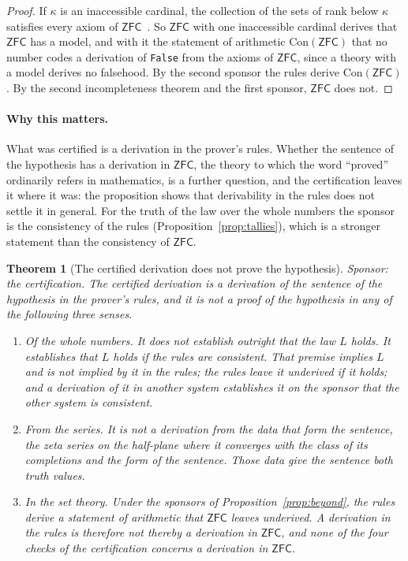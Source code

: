 \documentclass[11pt]{article}
\newtheorem{theorem}{Theorem}[section]
\theoremstyle{definition}
\theoremstyle{remark}
\DeclareRobustCommand{\lean}[1]{{\renewcommand{\_}{\textunderscore\allowbreak}\texttt{#1}}}
\newcommand{\False}{\lean{False}}
\begin{document}
\begin{proof}
If $\kappa$ is an inaccessible cardinal, the collection of the sets of rank below $\kappa$ satisfies every axiom of $\mathsf{ZFC}$~\citep[ch.~12]{jech}. So $\mathsf{ZFC}$ with one inaccessible cardinal derives that $\mathsf{ZFC}$ has a model, and with it the statement of arithmetic $\mathrm{Con}(\mathsf{ZFC})$ that no number codes a derivation of \False{} from the axioms of $\mathsf{ZFC}$, since a theory with a model derives no falsehood. By the second sponsor the rules derive $\mathrm{Con}(\mathsf{ZFC})$. By the second incompleteness theorem and the first sponsor, $\mathsf{ZFC}$ does not.
\end{proof}

\paragraph{Why this matters.} What was certified is a derivation in the prover's rules. Whether the sentence of the hypothesis has a derivation in $\mathsf{ZFC}$, the theory to which the word ``proved'' ordinarily refers in mathematics, is a further question, and the certification leaves it where it was: the proposition shows that derivability in the rules does not settle it in general. For the truth of the law over the whole numbers the sponsor is the consistency of the rules (Proposition~\ref{prop:tallies}), which is a stronger statement than the consistency of $\mathsf{ZFC}$.

\begin{theorem}[The certified derivation does not prove the hypothesis]\label{thm:notproof}
Sponsor: the certification. The certified derivation is a derivation of the sentence of the hypothesis in the prover's rules, and it is not a proof of the hypothesis in any of the following three senses.
\begin{enumerate}[leftmargin=2em,itemsep=1pt]
\item \emph{Of the whole numbers.} It does not establish outright that the law $L$ holds. It establishes that $L$ holds if the rules are consistent. That premise implies $L$ and is not implied by it in the rules; the rules leave it underived if it holds; and a derivation of it in another system establishes it on the sponsor that the other system is consistent.
\item \emph{From the series.} It is not a derivation from the data that form the sentence, the zeta series on the half-plane where it converges with the class of its completions and the form of the sentence. Those data give the sentence both truth values.
\item \emph{In the set theory.} Under the sponsors of Proposition~\ref{prop:beyond}, the rules derive a statement of arithmetic that $\mathsf{ZFC}$ leaves underived. A derivation in the rules is therefore not thereby a derivation in $\mathsf{ZFC}$, and none of the four checks of the certification concerns a derivation in $\mathsf{ZFC}$.
\end{enumerate}
\end{theorem}
\end{document}
